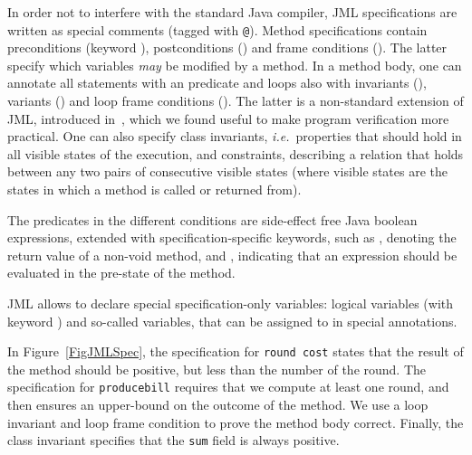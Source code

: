 In order not to interfere with the standard Java compiler, JML
specifications are written as special comments (tagged with
\texttt{@}). Method specifications contain preconditions (keyword
), postconditions () and frame
conditions (). The latter specify which variables
\emph{may} be modified by a method. In a method body, one can
annotate all statements with an  predicate and loops
also with invariants (), variants
() and loop frame conditions (). The latter is a non-standard extension of JML, introduced
in~\cite{BurdyRL03}, which we found useful to make program
verification more practical. One can also specify class invariants,
\emph{i.e.}\ properties that should hold in all visible states of the
execution, and constraints, describing a relation that 
holds between any two pairs of consecutive visible states (where
visible states are the states in which a method is called or returned
from).

The predicates in the different conditions are side-effect free Java
boolean expressions, extended with specification-specific keywords,
such as , denoting the return value of a non-void
method, and , indicating that an expression should be
evaluated in the pre-state of the method. 

JML allows to declare special specification-only variables: logical
variables (with keyword ) and so-called 
variables, that can be assigned to in special 
annotations.

In Figure~\ref{FigJMLSpec}, the specification for \texttt{round\unsc
cost} states that the result of the method should be positive, but
less than the number of the round. The specification for
\texttt{produce\unsc bill} requires that we compute at least one
round, and then ensures an upper-bound on the outcome of the
method. We use a loop invariant and loop frame condition to prove the
method body correct. Finally, the class invariant specifies that the
\texttt{sum} field is always positive.
     



